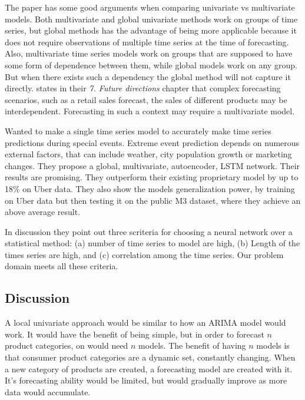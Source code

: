 The paper \cite{Rabanser2020} has some good arguments when comparing univariate vs multivariate models.
Both multivariate and global univariate methods work on groups of time series, but global methods
has the advantage of being more applicable because it does not require observations of multiple
time series at the time of forecasting.
Also, multivariate time series models work on groups that are supposed to have some form of 
dependence between them, while global models work on any group.
But when there exists such a dependency the global method will not capture it directly.
\cite{Hewamalage2021} states in their \textit{7. Future directions} chapter that complex
forecasting scenarios, such as a retail sales forecast, the sales of different products
may be interdependent.
Forecasting in such a context may require a multivariate model.

\cite{Laptev}
Wanted to make a single time series model to
accurately make time series predictions during special events.
Extreme event prediction depends on numerous external factors,
that can include weather, city population growth or marketing
changes.
They propose a global, multivariate, autoencoder, LSTM network.
Their results are promising. They outperform their existing
proprietary model by up to 18\% on Uber data.
They also show the models generalization power, by training on Uber data
but then testing it on the public M3 dataset, where they achieve an above average result.

In \cite{Laptev} discussion they point out three scriteria for 
choosing a neural network over a statistical method:
(a) number of time series to model are high, (b) Length of the 
times series are high, and (c) correlation among the time series.
Our problem domain meets all these criteria. 





\subsection{Discussion}
A local univariate approach would be similar to how an ARIMA model would work.
It would have the benefit of being simple, but in order to forecast $n$ product categories, 
on would need $n$ models.
The benefit of having $n$ models is that consumer product categories are a dynamic set, constantly changing.
When a new category of products are created, a forecasting model are created with it. It's forecasting ability
would be limited, but would gradually improve as more data would accumulate.

